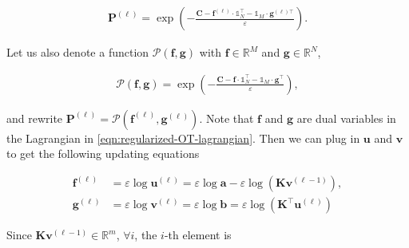 \begin{equation}\label{eqn:optimal-coupling-fg}
  \begin{aligned}
    \mathbf{P}^{(\ell)} = \exp \left(
    - \frac{\mathbf{C} - \mathbf{f}^{(\ell)} \cdot \mathbb{1}_N^\top -
      \mathbb{1}_M \cdot \mathbf{g}^{(\ell)\top}}{\varepsilon}
    \right).
  \end{aligned}
\end{equation}

Let us also denote a function $\mathcal{P}(\mathbf{f}, \mathbf{g})$ with
$\mathbf{f} \in \mathbb{R}^M$ and $\mathbf{g} \in \mathbb{R}^N$,

\begin{equation}\label{eqn:function-P}
  \begin{aligned}
    \mathcal{P}(\mathbf{f}, \mathbf{g})
    = \exp \left(
    - \frac{
      \mathbf{C} - \mathbf{f} \cdot \mathbb{1}_N^\top - \mathbb{1}_M \cdot \mathbf{g}^\top
    }{\varepsilon}
    \right),
  \end{aligned}
\end{equation}

and rewrite $\mathbf{P}^{(\ell)} = \mathcal{P}\left(\mathbf{f}^{(\ell)}, \mathbf{g}^{(\ell)}\right)$.
Note that $\mathbf{f}$ and $\mathbf{g}$ are dual variables in the Lagrangian in \cref{eqn:regularized-OT-lagrangian}.
Then we can plug in $\mathbf{u}$ and $\mathbf{v}$ to get the following updating equations

\begin{equation}\label{eqn:log-sinkhorn-update1}
  \begin{aligned}
    \mathbf{f}^{(\ell)}
     & = \varepsilon\log \mathbf{u}^{(\ell)}
    = \varepsilon\log \mathbf{a} - \varepsilon\log (\mathbf{K} \mathbf{v}^{(\ell-1)}), \\
    \mathbf{g}^{(\ell)}
     & = \varepsilon\log \mathbf{v}^{(\ell)}
    = \varepsilon\log \mathbf{b} = \varepsilon\log (\mathbf{K}^\top \mathbf{u}^{(\ell)})
  \end{aligned}
\end{equation}

Since $\mathbf{K}\mathbf{v}^{(\ell-1)} \in \mathbb{R}^m$, $\forall i$,
the $i$-th element is %

